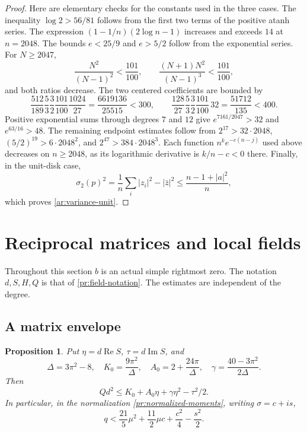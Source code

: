 \documentclass[11pt,reqno]{amsart}
\numberwithin{equation}{section}
\newtheorem{proposition}[theorem]{Proposition}
\theoremstyle{definition}
\theoremstyle{remark}
\renewcommand{\Re}{\operatorname{Re}}
\renewcommand{\Im}{\operatorname{Im}}
\begin{document}
\begin{proof}
Here are elementary checks for the constants used in the three cases.
The inequality $\log2>56/81$ follows from the first two terms of
the positive atanh series. The expression
$(1-1/n)(2\log n-1)$ increases and exceeds $14$ at $n=2048$.
The bounds $e<25/9$ and $e>5/2$ follow from the exponential series.
For $N\ge2047$,
\[
 \frac{N^2}{(N-1)^2}<\frac{101}{100},\qquad
 \frac{(N+1)N^2}{(N-1)^3}<\frac{101}{100},
\]
and both ratios decrease. The two centered coefficients are bounded by
\[
 \frac{512}{189}\frac53\frac32\frac{101}{100}\frac{1024}{27}
 =\frac{6619136}{25515}<300,
 \qquad
 \frac{128}{27}\frac53\frac32\frac{101}{100}\,32
 =\frac{51712}{135}<400.
\]
Positive exponential sums through degrees $7$ and $12$ give
$e^{7161/2047}>32$ and $e^{63/16}>48$.
The remaining endpoint estimates follow from
$2^{17}>32\cdot2048$,
$(5/2)^{19}>6\cdot2048^2$, and
$2^{47}>384\cdot2048^3$.
Each function $n^ke^{-c(n-j)}$ used above decreases on $n\ge2048$,
as its logarithmic derivative is $k/n-c<0$ there.
Finally, in the unit-disk case,
\[
 \sigma_2(p)^2=\frac1n\sum_i|z_i|^2-|\bar z|^2
 \le\frac{n-1+|a|^2}{n},
\]
which proves \eqref{ar:variance-unit}.
\end{proof}

\section{Reciprocal matrices and local fields}\label{sec:matrix-fields}

Throughout this section $b$ is an actual simple rightmost zero.
The notation $d,S,H,Q$ is that of \eqref{pr:field-notation}.
The estimates are independent of the degree.

\subsection{A matrix envelope}

\begin{proposition}\label{mf:envelope}
Put $\eta=d\Re S$, $\tau=d\Im S$, and
\[
 \Delta=3\pi^2-8,\quad K_0=\frac{9\pi^2}{\Delta},\quad
 A_0=2+\frac{24\pi}{\Delta},\quad
 \gamma=\frac{40-3\pi^2}{2\Delta}.
\]
Then
\begin{equation}\label{mf:exact-envelope}
 Qd^2\le K_0+A_0\eta+\gamma\eta^2-\tau^2/2.
\end{equation}
In particular, in the normalization \eqref{pr:normalized-moments},
writing $\sigma=c+is$,
\begin{equation}\label{mf:coarse-envelope}
 q<\frac{21}{5}\mu^2+\frac{11}{2}\mu c+\frac{c^2}{4}-\frac{s^2}{2}.
\end{equation}
\end{proposition}
\end{document}
